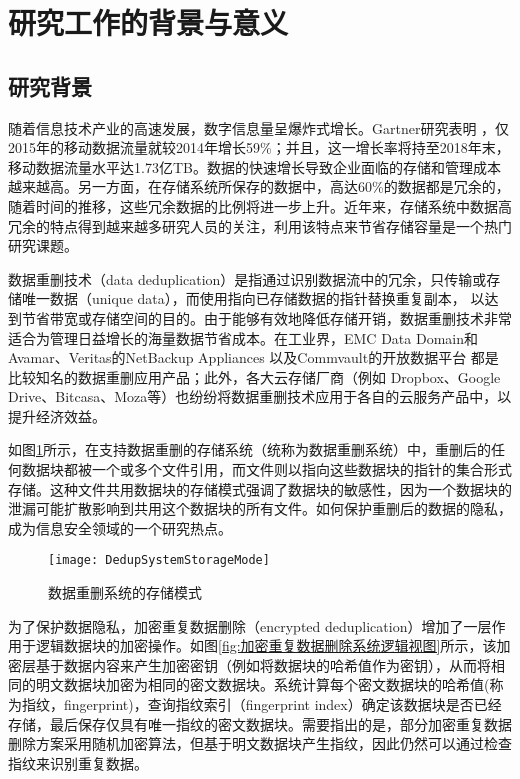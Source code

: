 \section{研究工作的背景与意义}
\subsection{研究背景}

随着信息技术产业的高速发展，数字信息量呈爆炸式增长。Gartner研究表明 ，仅2015年的移动数据流量就较2014年增长59\%；并且，这一增长率将持至2018年末，移动数据流量水平达1.73亿TB。数据的快速增长导致企业面临的存储和管理成本越来越高。另一方面，在存储系统所保存的数据中，高达60\%的数据都是冗余的，随着时间的推移，这些冗余数据的比例将进一步上升。近年来，存储系统中数据高冗余的特点得到越来越多研究人员的关注，利用该特点来节省存储容量是一个热门研究课题。

数据重删技术（data deduplication）是指通过识别数据流中的冗余，只传输或存储唯一数据（unique data），而使用指向已存储数据的指针替换重复副本， 以达到节省带宽或存储空间的目的。由于能够有效地降低存储开销，数据重删技术非常适合为管理日益增长的海量数据节省成本。在工业界，EMC Data Domain和Avamar、Veritas的NetBackup Appliances 以及Commvault的开放数据平台 都是比较知名的数据重删应用产品；此外，各大云存储厂商（例如 Dropbox、Google Drive、Bitcasa、Moza等）也纷纷将数据重删技术应用于各自的云服务产品中，以提升经济效益。

如图\ref{fig:数据重删系统的存储模式}所示，在支持数据重删的存储系统（统称为数据重删系统）中，重删后的任何数据块都被一个或多个文件引用，而文件则以指向这些数据块的指针的集合形式存储。这种文件共用数据块的存储模式强调了数据块的敏感性，因为一个数据块的泄漏可能扩散影响到共用这个数据块的所有文件。如何保护重删后的数据的隐私，成为信息安全领域的一个研究热点。

\begin{figure}[!htb]
    \small
    \centering
    \texttt{[image: DedupSystemStorageMode]}
    \caption{数据重删系统的存储模式} 
    \label{fig:数据重删系统的存储模式}
\end{figure}

为了保护数据隐私，加密重复数据删除（encrypted deduplication）增加了一层作用于逻辑数据块的加密操作。如图\ref{fig:加密重复数据删除系统逻辑视图}所示，该加密层基于数据内容来产生加密密钥（例如将数据块的哈希值作为密钥），从而将相同的明文数据块加密为相同的密文数据块。系统计算每个密文数据块的哈希值(称为指纹，fingerprint)，查询指纹索引（fingerprint index）确定该数据块是否已经存储，最后保存仅具有唯一指纹的密文数据块。需要指出的是，部分加密重复数据删除方案采用随机加密算法，但基于明文数据块产生指纹，因此仍然可以通过检查指纹来识别重复数据。


